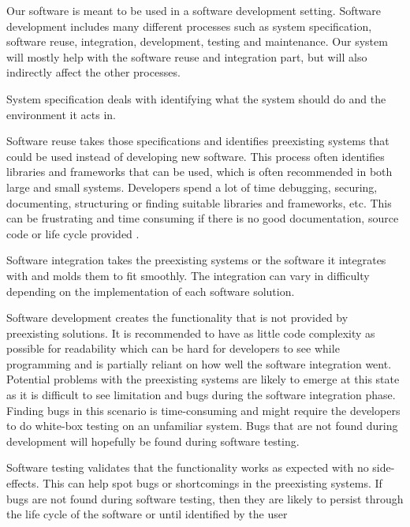 Our software is meant to be used in a software development setting. Software development \cite{wiki:softwareDevelopment} includes many different processes such as system specification, software reuse, integration, development, testing and maintenance. Our system will mostly help with the software reuse and integration part, but will also indirectly affect the other processes.

System specification deals with identifying what the system should do and the environment it acts in.

Software reuse takes those specifications and identifies preexisting systems that could be used instead of developing new software. This process often identifies libraries and frameworks that can be used, which is often recommended \cite{Krueger:1992:SR:130844.130856} in both large and small systems. Developers spend a lot of time debugging, securing, documenting, structuring or finding suitable libraries and frameworks, etc. This can be frustrating and time consuming if there is no good documentation, source code or life cycle provided \cite{mileva2009mining}.

Software integration takes the preexisting systems or the software it integrates with and molds them to fit smoothly. The integration can vary in difficulty depending on the implementation of each software solution. 

Software development creates the functionality that is not provided by preexisting solutions. It is recommended to have as little code complexity \cite{DBLP:journals/corr/abs-1712-00675} as possible for readability  \cite{spinellis2003readingWritingCode} which can be hard for developers to see while programming and is partially reliant on how well the software integration went. Potential problems with the preexisting systems are likely to emerge at this state as it is difficult to see limitation and bugs during the software integration phase. Finding bugs in this scenario is time-consuming \cite{westland2002cost} and might require the developers to do white-box testing on an unfamiliar system.
Bugs that are not found during development will hopefully be found during software testing.

Software testing validates that the functionality works as expected with no side-effects. This can help spot bugs or shortcomings in the preexisting systems. If bugs are not found during software testing, then they are likely to persist through the life cycle of the software or until identified by the user

